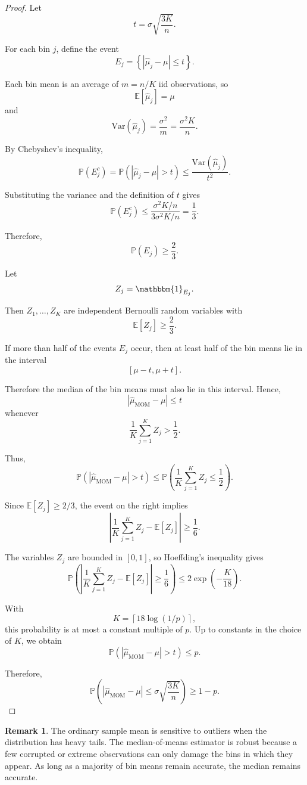 \documentclass[12pt,oneside]{book}
\numberwithin{equation}{section}
\theoremstyle{definition}
\newtheorem{remark}{Remark}[section]
\theoremstyle{plain}
\theoremstyle{remark}
\newcommand{\E}{\mathbb{E}}
\newcommand{\Var}{\mathrm{Var}}
\newcommand{\Prob}{\mathbb{P}}
\newcommand{\ind}{\mathbbm{1}}
\begin{document}
\begin{proof}
Let
\[
t
=
\sigma\sqrt{\frac{3K}{n}}.
\]

For each bin $j$, define the event
\[
E_j
=
\left\{
|\widehat{\mu}_j-\mu|\leq t
\right\}.
\]

Each bin mean is an average of $m=n/K$ iid observations, so
\[
\E[\widehat{\mu}_j]=\mu
\]
and
\[
\Var(\widehat{\mu}_j)
=
\frac{\sigma^2}{m}
=
\frac{\sigma^2K}{n}.
\]

By Chebyshev's inequality,
\[
\Prob(E_j^c)
=
\Prob\left(
|\widehat{\mu}_j-\mu|>t
\right)
\leq
\frac{\Var(\widehat{\mu}_j)}{t^2}.
\]

Substituting the variance and the definition of $t$ gives
\[
\Prob(E_j^c)
\leq
\frac{\sigma^2K/n}{3\sigma^2K/n}
=
\frac{1}{3}.
\]

Therefore,
\[
\Prob(E_j)\geq \frac{2}{3}.
\]

Let
\[
Z_j=\ind_{E_j}.
\]

Then $Z_1,\dots,Z_K$ are independent Bernoulli random variables with
\[
\E[Z_j]\geq \frac{2}{3}.
\]

If more than half of the events $E_j$ occur, then at least half of the bin means lie in the interval
\[
[\mu-t,\mu+t].
\]

Therefore the median of the bin means must also lie in this interval. Hence,
\[
|\widehat{\mu}_{\mathrm{MOM}}-\mu|\leq t
\]
whenever
\[
\frac{1}{K}\sum_{j=1}^K Z_j>\frac{1}{2}.
\]

Thus,
\[
\Prob\left(
|\widehat{\mu}_{\mathrm{MOM}}-\mu|>t
\right)
\leq
\Prob\left(
\frac{1}{K}\sum_{j=1}^K Z_j\leq \frac{1}{2}
\right).
\]

Since $\E[Z_j]\geq 2/3$, the event on the right implies
\[
\left|
\frac{1}{K}\sum_{j=1}^K Z_j
-
\E[Z_j]
\right|
\geq
\frac{1}{6}.
\]

The variables $Z_j$ are bounded in $[0,1]$, so Hoeffding's inequality gives
\[
\Prob\left(
\left|
\frac{1}{K}\sum_{j=1}^K Z_j
-
\E[Z_j]
\right|
\geq
\frac{1}{6}
\right)
\leq
2\exp\left(-\frac{K}{18}\right).
\]

With
\[
K=\left\lceil 18\log(1/p)\right\rceil,
\]
this probability is at most a constant multiple of $p$. Up to constants in the choice of $K$, we obtain
\[
\Prob\left(
|\widehat{\mu}_{\mathrm{MOM}}-\mu|>t
\right)
\leq
p.
\]

Therefore,
\[
\Prob\left(
|\widehat{\mu}_{\mathrm{MOM}}-\mu|
\leq
\sigma\sqrt{\frac{3K}{n}}
\right)
\geq
1-p.
\]
\end{proof}

\begin{remark}
The ordinary sample mean is sensitive to outliers when the distribution has heavy tails. The median-of-means estimator is robust because a few corrupted or extreme observations can only damage the bins in which they appear. As long as a majority of bin means remain accurate, the median remains accurate.
\end{remark}
\end{document}
